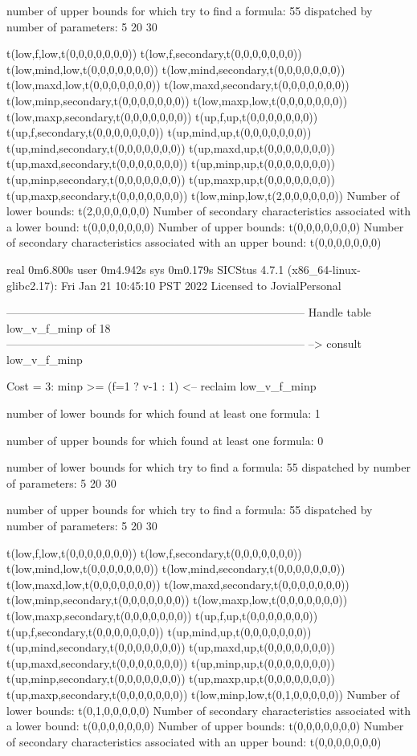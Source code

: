number of upper bounds for which try to find a formula: 55
dispatched by number of parameters: 5  20  30

t(low,f,low,t(0,0,0,0,0,0,0))
t(low,f,secondary,t(0,0,0,0,0,0,0))
t(low,mind,low,t(0,0,0,0,0,0,0))
t(low,mind,secondary,t(0,0,0,0,0,0,0))
t(low,maxd,low,t(0,0,0,0,0,0,0))
t(low,maxd,secondary,t(0,0,0,0,0,0,0))
t(low,minp,secondary,t(0,0,0,0,0,0,0))
t(low,maxp,low,t(0,0,0,0,0,0,0))
t(low,maxp,secondary,t(0,0,0,0,0,0,0))
t(up,f,up,t(0,0,0,0,0,0,0))
t(up,f,secondary,t(0,0,0,0,0,0,0))
t(up,mind,up,t(0,0,0,0,0,0,0))
t(up,mind,secondary,t(0,0,0,0,0,0,0))
t(up,maxd,up,t(0,0,0,0,0,0,0))
t(up,maxd,secondary,t(0,0,0,0,0,0,0))
t(up,minp,up,t(0,0,0,0,0,0,0))
t(up,minp,secondary,t(0,0,0,0,0,0,0))
t(up,maxp,up,t(0,0,0,0,0,0,0))
t(up,maxp,secondary,t(0,0,0,0,0,0,0))
t(low,minp,low,t(2,0,0,0,0,0,0))
Number of lower bounds:                                             t(2,0,0,0,0,0,0)
Number of secondary characteristics associated with a lower bound:  t(0,0,0,0,0,0,0)
Number of upper bounds:                                             t(0,0,0,0,0,0,0)
Number of secondary characteristics associated with an upper bound: t(0,0,0,0,0,0,0)

real	0m6.800s
user	0m4.942s
sys	0m0.179s
SICStus 4.7.1 (x86_64-linux-glibc2.17): Fri Jan 21 10:45:10 PST 2022
Licensed to JovialPersonal


--------------------------------------------------------------------------------
Handle table low_v_f_minp of 18
--------------------------------------------------------------------------------
--> consult low_v_f_minp

Cost =  3:  minp >= (f=1 ? v-1 : 1)
<-- reclaim low_v_f_minp

number of lower bounds for which found at least one formula: 1

number of upper bounds for which found at least one formula: 0

number of lower bounds for which try to find a formula: 55
dispatched by number of parameters: 5  20  30

number of upper bounds for which try to find a formula: 55
dispatched by number of parameters: 5  20  30

t(low,f,low,t(0,0,0,0,0,0,0))
t(low,f,secondary,t(0,0,0,0,0,0,0))
t(low,mind,low,t(0,0,0,0,0,0,0))
t(low,mind,secondary,t(0,0,0,0,0,0,0))
t(low,maxd,low,t(0,0,0,0,0,0,0))
t(low,maxd,secondary,t(0,0,0,0,0,0,0))
t(low,minp,secondary,t(0,0,0,0,0,0,0))
t(low,maxp,low,t(0,0,0,0,0,0,0))
t(low,maxp,secondary,t(0,0,0,0,0,0,0))
t(up,f,up,t(0,0,0,0,0,0,0))
t(up,f,secondary,t(0,0,0,0,0,0,0))
t(up,mind,up,t(0,0,0,0,0,0,0))
t(up,mind,secondary,t(0,0,0,0,0,0,0))
t(up,maxd,up,t(0,0,0,0,0,0,0))
t(up,maxd,secondary,t(0,0,0,0,0,0,0))
t(up,minp,up,t(0,0,0,0,0,0,0))
t(up,minp,secondary,t(0,0,0,0,0,0,0))
t(up,maxp,up,t(0,0,0,0,0,0,0))
t(up,maxp,secondary,t(0,0,0,0,0,0,0))
t(low,minp,low,t(0,1,0,0,0,0,0))
Number of lower bounds:                                             t(0,1,0,0,0,0,0)
Number of secondary characteristics associated with a lower bound:  t(0,0,0,0,0,0,0)
Number of upper bounds:                                             t(0,0,0,0,0,0,0)
Number of secondary characteristics associated with an upper bound: t(0,0,0,0,0,0,0)

